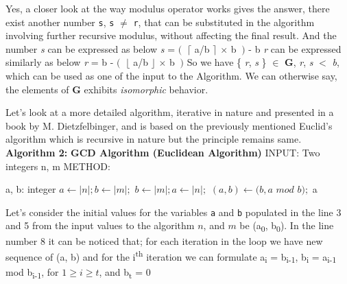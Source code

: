 \documentclass[12pt]{article}
\begin{document}
Yes, a closer look at the way modulus operator works gives the answer, there exist another  number \texttt{s}, \texttt{s} $\neq$ \texttt{r}, that can be substituted in the algorithm involving further recursive modulus, without affecting the final result. And the number \textit{s} can be expressed as below
\newline \vspace{0mm} \hspace{4cm} \textit{s} = $ (\ $ $\lceil$ a/b $\rceil$  $\times $ b $\ )$ - b
\newline \textit{r} can be expressed similarly as below
\newline \vspace{0mm} \hspace{4cm}\textit{r} = b - $ (\ $ $\lfloor$ a/b $\rfloor$  $\times $ b $\ )$
\newline So we have \{ \textit{r}, \textit{s} \} $\in$ \textbf{G}, \textit{r}, \textit{s} $<$ \textit{b}, which can be used as one of the input to the Algorithm. 
\newline We can otherwise say, the elements of \textbf{G} exhibits \textit{isomorphic }  behavior.

Let's look at a more detailed algorithm, iterative in nature and presented in a book by M. Dietzfelbinger, and is based on the previously mentioned Euclid's algorithm which is recursive in nature but the principle remains same.
\newline
\newline \textbf{Algorithm 2:}
\newline \textbf{GCD Algorithm (Euclidean Algorithm)}
\newline INPUT: Two integers n, m
\newline METHOD:


\begin{algorithmic}[1]
\STATE a, b: integer
	\STATE $a \gets |n|; b \gets |m|;$
\ELSE
	\STATE $b \gets |m|; a \gets |n|;$
\ENDIF
{} 
	\STATE $(a, b) \leftarrow (b, a  $ $mod $ $b);$
\ENDWHILE
\RETURN a
\end {algorithmic}

Let's consider the initial values for the variables \texttt{a} and \texttt{b} populated in the line 3 and 5 from the input values to the algorithm $n$, and $m$ be (a\textsubscript{0}, b\textsubscript{0}). In the line number 8 it can be noticed that; for each iteration in the loop we have new sequence of (a, b) and for the i\textsuperscript{th} iteration we can formulate a\textsubscript{i} = b\textsubscript{i-1}, b\textsubscript{i} = a\textsubscript{i-1} mod b\textsubscript{i-1}, for $1 \geq i \geq t$, and b\textsubscript{t} = 0
\end{document}
